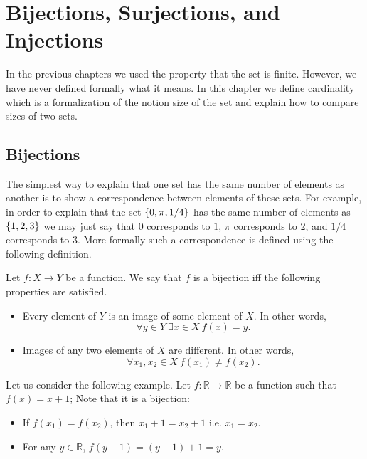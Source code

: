 \chapter{Bijections, Surjections, and Injections}
\label{chapter:bijections-surjections-injections}

In the previous chapters we used the property that the set is finite. However,
we have never defined formally what it means. In this chapter we define
cardinality which is a formalization of the notion size of the set and explain
how to compare sizes of two sets.

\section{Bijections}
The simplest way to explain that one set has the same number of elements as
another is to show a correspondence between elements of these sets. For example,
in order to explain that the set $\set{0, \pi, 1 / 4}$ has the same number of
elements as $\set{1, 2, 3}$ we may just say that $0$ corresponds to $1$,
$\pi$ corresponds to $2$, and $1 / 4$ corresponds to $3$. More formally such a
correspondence is defined using the following definition.
\begin{definition}
  Let $f : X \to Y$ be a function. We say that $f$ is a bijection iff the
  following properties are satisfied.
  \begin{itemize}
    \item Every element of $Y$ is an image of some element of $X$. In other
    words,
      \[
          \forall y \in Y~\exists x \in X\ f(x) = y.
      \]
    \item Images of any two elements
      of $X$ are different. In other words,
      \[
          \forall x_1, x_2 \in X\ f(x_1) \neq f(x_2).
      \]
    \end{itemize}
\end{definition}

Let us consider the following example. Let $f : \mathbb{R} \to \mathbb{R}$ be a
function such that $f(x) = x + 1$; Note that it is a bijection:
\begin{itemize}
  \item If $f(x_1) = f(x_2)$, then $x_1 + 1 = x_2 + 1$ i.e. $x_1 = x_2$.
  \item For any $y \in \mathbb{R}$, $f(y - 1) = (y - 1) + 1 = y$.
\end{itemize}



